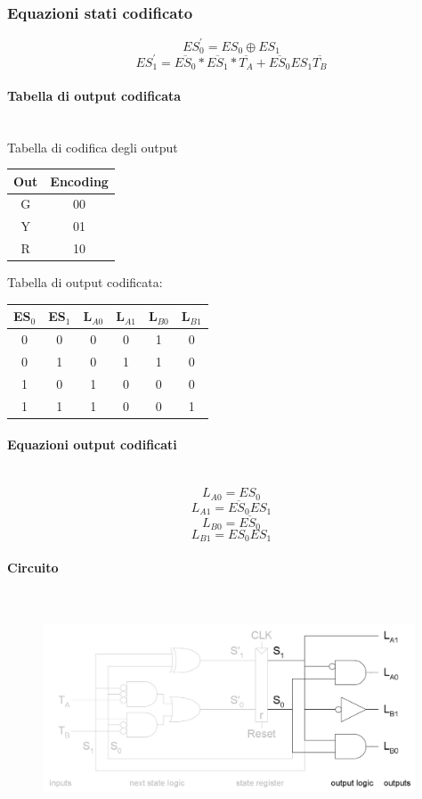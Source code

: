 \documentclass{report}
\newcommand{\n}[1]{\overline{#1}}
\newcommand{\subsubsubsection}[1]{\paragraph{#1}\mbox{}\\}
\begin{document}
            \subsubsection{Equazioni stati codificato}
                $$ES^{'}_0 = ES_0 \oplus ES_1$$
                $$ES^{'}_1 = \n{ES_0} * \n{ES_1} * \n{T_A} + \n{ES_0}ES_1\n{T_B}$$
            \subsubsubsection{Tabella di output codificata}
                Tabella di codifica degli output
                \begin{center}
                    \begin{tabular}{|c|c|}
                        \hline
                        Out & Encoding \\
                        \hline
                        G & 00 \\
                        \hline
                        Y & 01 \\
                        \hline
                        R & 10 \\
                        \hline
                    \end{tabular}
                \end{center}
                Tabella di output codificata:
                \begin{center}
                \begin{tabular}{|c|c|c|c|c|c|}
                    \hline
                    ES$_0$ & ES$_1$ & L$_{A0}$ & L$_{A1}$ & L$_{B0}$ & L$_{B1}$ \\
                    \hline
                    0 & 0 & 0 & 0 & 1 & 0 \\
                    \hline
                    0 & 1 & 0 & 1 & 1 & 0 \\
                    \hline
                    1 & 0 & 1 & 0 & 0 & 0 \\
                    \hline
                    1 & 1 & 1 & 0 & 0 & 1 \\
                    \hline
                \end{tabular}
                \end{center}
            \subsubsubsection{Equazioni output codificati}
                $$L_{A0} = ES_0$$
                $$L_{A1} = \n{ES_0}ES_1$$
                $$L_{B0} = \n{ES_0}$$
                $$L_{B1} = ES_0ES_1$$
            \subsubsubsection{Circuito}
                \begin{center}
                    \begin{figure}[H]
                        \includegraphics[width = \textwidth, height = 5cm]{fsmc.png}
                    \end{figure}
                \end{center}
\end{document}
